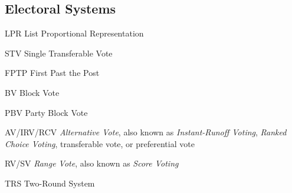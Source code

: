 \subsection*{Electoral Systems}
\begin{symbollist}
	\item[LPR] List Proportional Representation
	\item[STV] Single Transferable Vote
	\item[FPTP] First Past the Post
	\item[BV] Block Vote
	\item[PBV] Party Block Vote
	\item[AV/IRV/RCV] \emph{Alternative Vote}, also known as \emph{Instant-Runoff
		Voting}, \emph{Ranked Choice Voting}, transferable vote, or preferential
		vote
	\item[RV/SV] \emph{Range Vote}, also known as \emph{Score Voting}
	\item[TRS] Two-Round System
\end{symbollist}
